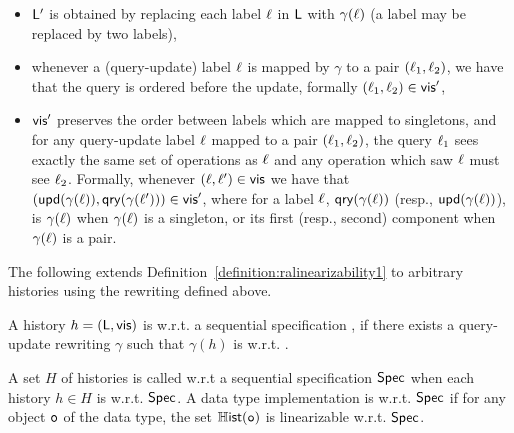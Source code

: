 \begin{itemize}
\item $\mathsf{L}'$ is obtained by replacing each label $\ell$ in
  $\mathsf{L}$ with $\gamma(\ell)$ (a label may be replaced by two
  labels),
\item whenever a (query-update) label $\ell$ is mapped by $\gamma$
  to a pair $(\ell_1,\ell_2)$, we have that the query is
  ordered before the update, formally $(\ell_1,\ell_2)\in \mathsf{vis}'$,
\item $\mathsf{vis}'$ preserves the order between labels which are
  mapped to singletons, and
  for any query-update label $\ell$ mapped to a pair
 $(\ell_1,\ell_2)$, the query $\ell_1$ sees exactly the same
 set of operations as $\ell$ and any operation which saw $\ell$
 must see $\ell_2$.
 Formally, whenever $(\ell,\ell')\in\mathsf{vis}$ we have that
 $(\mathsf{upd}(\gamma(\ell)),
 \mathsf{qry}(\gamma(\ell')))\in\mathsf{vis}'$, where for a label $\ell$,
 $\mathsf{qry}(\gamma(\ell))$ (resp., $\mathsf{upd}(\gamma(\ell))$), is
 $\gamma(\ell)$ when $\gamma(\ell)$ is a singleton, or its first (resp.,
 second) component when $\gamma(\ell)$ is a pair.
\end{itemize}
The following
extends Definition~\ref{definition:ralinearizability1} to arbitrary histories
using the rewriting defined above.

\begin{definition}[\CRDTLin{}]
  \label{definition:distributed linearizability} A history $h =
  (\mathsf{L},\mathsf{vis})$ is \crdtlinearizable{} w.r.t. a
   sequential specification
  \Spec{}, if there exists a query-update rewriting $\gamma$ such that $\gamma(h)$ is \crdtlinearizable{} w.r.t. \Spec{}.
\end{definition}


A set $H$ of histories is called \crdtlinearizable{} w.r.t a
sequential specification $\mathsf{Spec}$ when each history $h\in H$ is
\crdtlinearizable{} w.r.t.
$\mathsf{Spec}$.
A data type implementation is \crdtlinearizable{} w.r.t.
$\mathsf{Spec}$ if for any object $\mathtt{o}$ of the data type, the set
$\mathbb{H}\mathsf{ist}(\mathtt{o})$ is linearizable w.r.t. $\mathsf{Spec}$.


